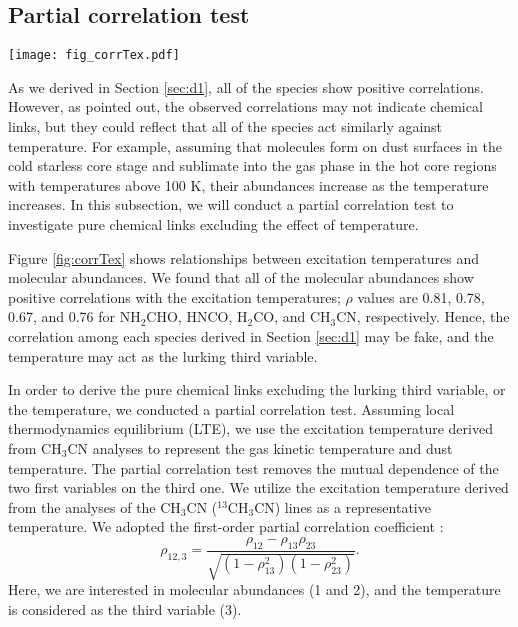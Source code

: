 \documentclass[twocolumn, twocolappendix]{aastex631}
\begin{document}
\subsection{Partial correlation test} \label{sec:d2}

\begin{figure*}[th]
 \begin{center}
  \texttt{[image: fig\_corrTex.pdf]}
 \end{center}
\caption{Relationships between excitation temperatures and molecular abundances. \label{fig:corrTex}}
\end{figure*}

As we derived in Section \ref{sec:d1}, all of the species show positive correlations.
However, as \citet{2018MNRAS.474.2796Q} pointed out, the observed correlations may not indicate chemical links, but they could reflect that all of the species act similarly against temperature.
For example, assuming that molecules form on dust surfaces in the cold starless core stage and sublimate into the gas phase in the hot core regions with temperatures above 100 K, their abundances increase as the temperature increases.
In this subsection, we will conduct a partial correlation test to investigate pure chemical links excluding the effect of temperature.

Figure \ref{fig:corrTex} shows relationships between excitation temperatures and molecular abundances.
We found that all of the molecular abundances show positive correlations with the excitation temperatures; $\rho$ values are 0.81, 0.78, 0.67, and 0.76 for NH$_{2}$CHO, HNCO, H$_{2}$CO, and CH$_{3}$CN, respectively.
Hence, the correlation among each species derived in Section \ref{sec:d1} may be fake, and the temperature may act as the lurking third variable.

In order to derive the pure chemical links excluding the lurking third variable, or the temperature, we conducted a partial correlation test.
Assuming local thermodynamics equilibrium (LTE), we use the excitation temperature derived from CH$_{3}$CN analyses to represent the gas kinetic temperature and dust temperature. 
The partial correlation test removes the mutual dependence of the two first variables on the third one.
We utilize the excitation temperature derived from the analyses of the CH$_{3}$CN ($^{13}$CH$_{3}$CN) lines as a representative temperature.
We adopted the first-order partial correlation coefficient \citep[e.g.,][]{2012psa..book.....W,2018MNRAS.473.1059U}:
\begin{equation}
\rho_{12,3} = \frac{\rho_{12}-\rho_{13}\rho_{23}}{\sqrt{(1-\rho^{2}_{13})(1-\rho^{2}_{23})}}.
\end{equation}
Here, we are interested in molecular abundances (1 and 2), and the temperature is considered as the third variable (3).
\end{document}
